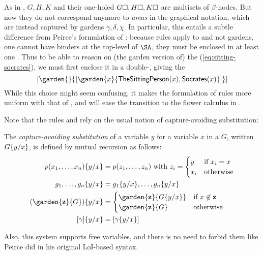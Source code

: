 \begin{scope}
\begin{scope}
\begin{remark}
  As in ,  $G, H, K$ and their one-holed 
  $G\square, H\square, K\square$ are multisets of $\beta$-nodes. But now they do not
  correspond anymore to \emph{areas} in the graphical notation, which are
  instead captured by gardens $\gamma, \delta, \chi$. In particular, this
  entails a subtle difference from Peirce's formulation of : because
  rules apply to  and not gardens, one cannot have binders at the
  top-level of $\SA$, they must be enclosed in at least one . Thus to be able
  to reason on (the garden version of) the  (\ref{eq:sitting-socrates}), we
  must first enclose it in a double-, giving the 
  $$[\garden{{}}{[\garden{x}{\mathsf{TheSittingPerson}(x),\mathsf{Socrates}(x)}]}]$$
  While this choice might seem confusing, it makes the formulation of rules more
  uniform with that of , and will ease the transition to the flower
  calculus in .
\end{remark}

Note that the rules  and  rely on the usual notion
of capture-avoiding substitution:

\begin{definition}[Substitution]
  The \emph{capture-avoiding substitution} of a variable $y$ for a variable $x$
  in a  $G$, written $G \{ y / x \}$, is defined by mutual
  recursion as follows:
  \begin{align*}
    \subst{p(x_1,\ldots,x_n)}{y}{x} &= p(z_1, \ldots, z_n) \text{ with } z_i = \begin{cases}
      y &\text{if $x_i = x$} \\
      x_i &\text{otherwise}
    \end{cases} \\
    \subst{g_1, \ldots, g_n}{y}{x} &= \subst{g_1}{y}{x}, \ldots, \subst{g_n}{y}{x} \\
    \subst{(\garden{\bz}{G})}{y}{x} &= \begin{cases}
      \garden{\bz}{\subst{G}{y}{x}} &\text{if $x \not\in \bz$} \\
      \garden{\bz}{G} &\text{otherwise}
    \end{cases} \\
    \subst{[\gamma]}{y}{x} &= [\subst{\gamma}{y}{x}]
  \end{align*}
\end{definition}

Also, this system supports free variables, and there is no need to forbid them
like Peirce did in his original LoI-based syntax.


\end{scope}
\end{scope}